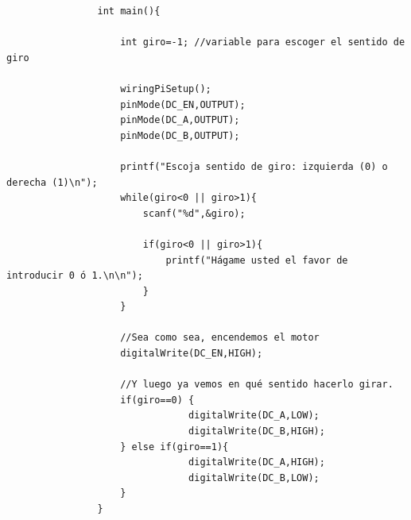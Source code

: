 \documentclass[11pt, a4paper]{article}
\begin{document}
\begin{enumerate}[(a)]
\begin{verbatim}
				int main(){
					
					int giro=-1; //variable para escoger el sentido de giro
					
					wiringPiSetup();
					pinMode(DC_EN,OUTPUT);
					pinMode(DC_A,OUTPUT);
					pinMode(DC_B,OUTPUT);
				
					printf("Escoja sentido de giro: izquierda (0) o derecha (1)\n");
					while(giro<0 || giro>1){
						scanf("%d",&giro);
				
						if(giro<0 || giro>1){
							printf("Hágame usted el favor de introducir 0 ó 1.\n\n");
						}
					}
				    
				    //Sea como sea, encendemos el motor
				    digitalWrite(DC_EN,HIGH);
				    
				    //Y luego ya vemos en qué sentido hacerlo girar.
				    if(giro==0) {
								digitalWrite(DC_A,LOW);
								digitalWrite(DC_B,HIGH);
				    } else if(giro==1){
								digitalWrite(DC_A,HIGH);
								digitalWrite(DC_B,LOW);
				    }
				}
			\end{verbatim}
			
		\end{enumerate}
\end{document}
